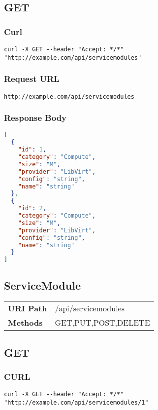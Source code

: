 \subsection{GET}
\subsubsection{Curl}
\begin{lstlisting}[] 
  curl -X GET --header "Accept: */*" "http://example.com/api/servicemodules"
\end{lstlisting}


\subsubsection{Request URL}
\begin{lstlisting}[] 
http://example.com/api/servicemodules
\end{lstlisting}

\subsubsection{Response Body}
\begin{lstlisting}[language=json] 
[
  {
    "id": 1,
    "category": "Compute",
    "size": "M",
    "provider": "LibVirt",
    "config": "string",
    "name": "string"
  },
  {
    "id": 2,
    "category": "Compute",
    "size": "M",
    "provider": "LibVirt",
    "config": "string",
    "name": "string"
  }
]
\end{lstlisting}

\subsection{ServiceModule}
\begin{tabularx}{\linewidth}{l l}
\textbf{URI Path} & /api/servicemodules\\
\textbf{Methods} & GET,PUT,POST,DELETE\\
\end{tabularx}

\subsection{GET}
\subsubsection{CURL}
\begin{lstlisting}[] 
curl -X GET --header "Accept: */*" "http://example.com/api/servicemodules/1"
\end{lstlisting}


